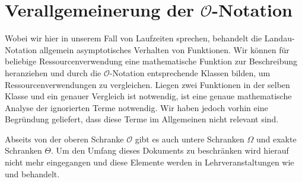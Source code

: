 \section{Verallgemeinerung der $\mathcal{O}$-Notation}
%
Wobei wir hier in unserem Fall von Laufzeiten sprechen, behandelt die Landau-Notation allgemein asymptotisches Verhalten von Funktionen. Wir können für beliebige Ressourcenverwendung eine mathematische Funktion zur Beschreibung heranziehen und durch die $\mathcal{O}$-Notation entsprechende Klassen bilden, um Ressourcenverwendungen zu vergleichen. Liegen zwei Funktionen in der selben Klasse und ein genauer Vergleich ist notwendig, ist eine genaue mathematische Analyse der ignorierten Terme notwendig. Wir haben jedoch vorhin eine Begründung geliefert, dass diese Terme im Allgemeinen nicht relevant sind.

Abseits von der oberen Schranke $\mathcal{O}$ gibt es auch untere Schranken $\Omega$ und exakte Schranken $\Theta$. Um den Umfang dieses Dokuments zu beschränken wird hierauf nicht mehr eingegangen und diese Elemente werden in Lehrveranstaltungen wie \coursedsa{} und \coursedaa{} behandelt.

